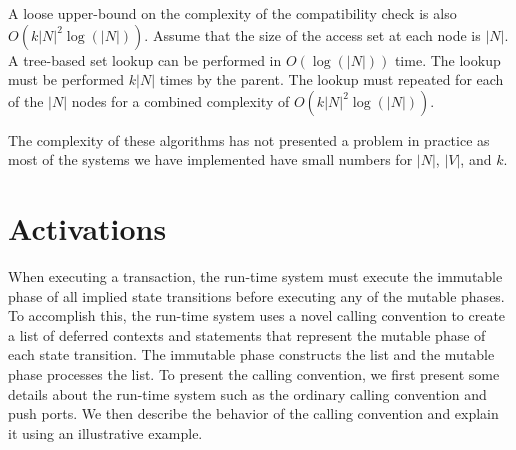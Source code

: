 A loose upper-bound on the complexity of the compatibility check is also $O(k |N|^2 \log (|N|))$.
Assume that the size of the access set at each node is $|N|$.
A tree-based set lookup can be performed in $O(\log(|N|))$ time.
The lookup must be performed $k |N|$ times by the parent.
The lookup must repeated for each of the $|N|$ nodes for a combined complexity of $O(k |N|^2 \log (|N|))$.

The complexity of these algorithms has not presented a problem in practice as most of the systems we have implemented have small numbers for $|N|$, $|V|$, and $k$.

\section{Activations}
\label{activations}

When executing a transaction, the \rcgo{} run-time system must execute the immutable phase of all implied state transitions before executing any of the mutable phases.
To accomplish this, the run-time system uses a novel calling convention to create a list of deferred contexts and statements that represent the mutable phase of each state transition.
The immutable phase constructs the list and the mutable phase processes the list.
To present the calling convention, we first present some details about the run-time system such as the ordinary calling convention and push ports.
We then describe the behavior of the calling convention and explain it using an illustrative example.

